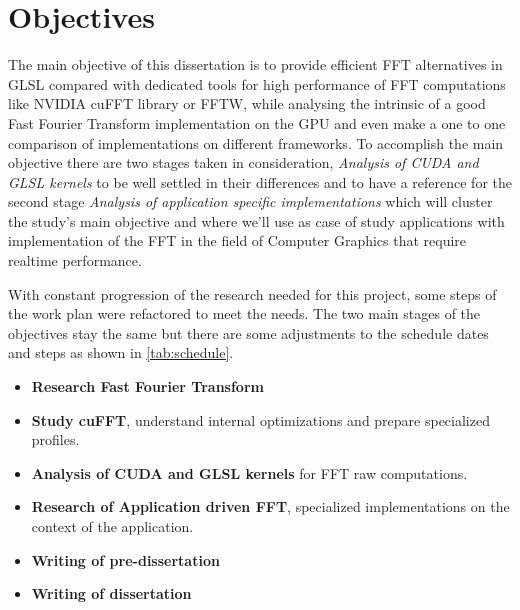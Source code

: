 \documentclass[
  oneside,
  11pt, a4paper,
  footinclude=true,
  headinclude=true,
  cleardoublepage=empty
]{scrbook}
\begin{document}
\section{Objectives} \label{sec:objectives}

The main objective of this dissertation is to provide efficient FFT alternatives in GLSL compared with dedicated tools for high performance of FFT computations like NVIDIA cuFFT library or FFTW, while analysing the intrinsic of a good Fast Fourier Transform implementation on the GPU and even make a one to one comparison of implementations on different frameworks. %
To accomplish the main objective there are two stages taken in consideration, \textit{Analysis of CUDA and GLSL kernels} to be well settled in their differences and to have a reference for the second stage \textit{Analysis of application specific implementations} which will cluster the study's main objective and where we'll use as case of study applications with implementation of the FFT in the field of Computer Graphics that require realtime performance.


With constant progression of the research needed for this project, some steps of the work plan were refactored to meet the needs. The two main stages of the objectives stay the same but there are some adjustments to the schedule dates and steps as shown in \autoref{tab:schedule}.

\begin{itemize}
    \item \textbf{Research Fast Fourier Transform}
    \item \textbf{Study cuFFT}, understand internal optimizations and prepare specialized profiles.
    \item \textbf{Analysis of CUDA and GLSL kernels} for FFT raw computations.
    \item \textbf{Research of Application driven FFT}, specialized implementations on the context of the application.
    \item \textbf{Writing of pre-dissertation}
    \item \textbf{Writing of dissertation}
\end{itemize}
\end{document}
